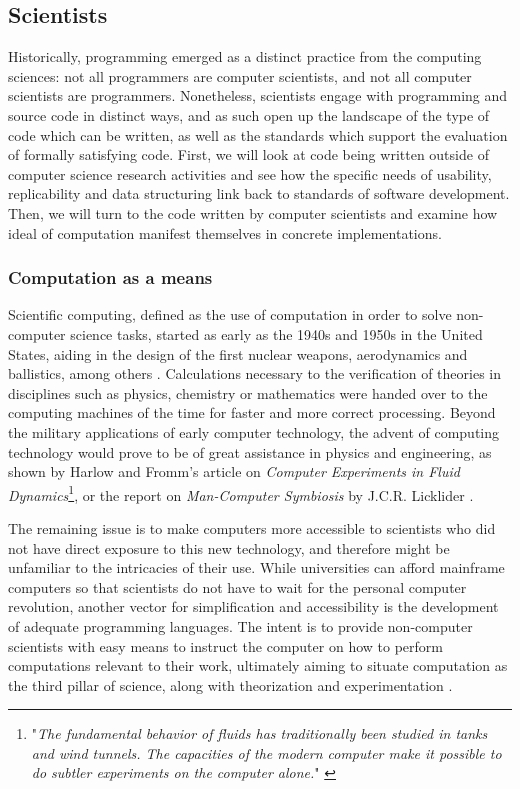 \subsection{Scientists}
\label{subsec:scientists}

Historically, programming emerged as a distinct practice from the computing sciences: not all programmers are computer scientists, and not all computer scientists are programmers. Nonetheless, scientists engage with programming and source code in distinct ways, and as such open up the landscape of the type of code which can be written, as well as the standards which support the evaluation of formally satisfying code. First, we will look at code being written outside of computer science research activities and see how the specific needs of usability, replicability and data structuring link back to standards of software development. Then, we will turn to the code written by computer scientists and examine how ideal of computation manifest themselves in concrete implementations.

\subsubsection{Computation as a means}
\label{subsubsec:computation-means}

Scientific computing, defined as the use of computation in order to solve non-computer science tasks, started as early as the 1940s and 1950s in the United States, aiding in the design of the first nuclear weapons, aerodynamics and ballistics, among others \citep{oberkampf_verification_2010}. Calculations necessary to the verification of theories in disciplines such as physics, chemistry or mathematics were handed over to the computing machines of the time for faster and more correct processing. Beyond the military applications of early computer technology, the advent of computing technology would prove to be of great assistance in physics and engineering, as shown by Harlow and Fromm's article on \emph{Computer Experiments in Fluid Dynamics}\footnote{"\emph{The fundamental behavior of fluids has traditionally been studied in tanks and wind tunnels. The capacities of the modern computer make it possible to do subtler experiments on the computer alone.}" \citep{harlow_computer_1965}}, or the report on \emph{Man-Computer Symbiosis} by J.C.R. Licklider \citep{licklider_mancomputer_1960}.

The remaining issue is to make computers more accessible to scientists who did not have direct exposure to this new technology, and therefore might be unfamiliar to the intricacies of their use. While universities can afford mainframe computers so that scientists do not have to wait for the personal computer revolution, another vector for simplification and accessibility is the development of adequate programming languages. The intent is to provide non-computer scientists with easy means to instruct the computer on how to perform computations relevant to their work, ultimately aiming to situate computation as the third pillar of science, along with theorization and experimentation \citep{vardi_science_2010}.

